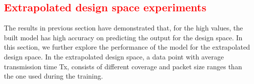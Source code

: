 





\subsection{\textcolor{red}{Extrapolated design space experiments}}


 
 The results in previous section have demonstrated that, for the high values, the built model has high accuracy on predicting the output for the design space. In this section, we further explore the performance of the model for the extrapolated design space. In the extrapolated design space, a data point with average transmission time Tx, consists of different coverage and packet size ranges than the one used during the training.
 
